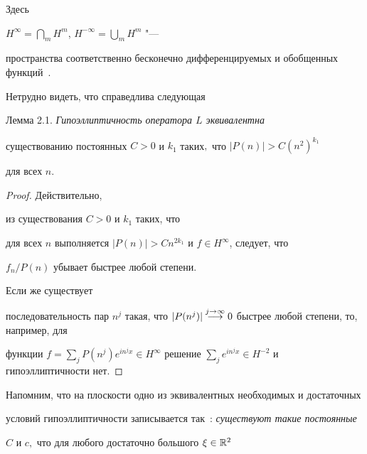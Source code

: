 Здесь

$H^\infty ={\bigcap_m} H^m$, $H^{- \infty} = {\bigcup_m} H^m$ "---

пространства соответственно бесконечно дифференцируемых и обобщенных функций~\cite{bur:1}.



Нетрудно видеть, что справедлива следующая



\smallskip



\hypertarget{bur:lemma:2.1}{}



{\small\sc Лемма  2.1.} \it Гипоэллиптичность оператора $L$ эквивалентна

существованию постоянных $C > 0$ и $k_1$ таких$,$ что $|P(n)| > C (n^2)^{k_1}$

для всех $n.$



\smallskip



\rm



\begin{proof} Действительно,

из существования $C > 0$ и $k_1$ таких, что

для всех $n$ выполняется $ |P(n)| > C n^{2 k_1}$ и $f \in H^\infty$, следует, что

${f_n}/{P(n)}$ убывает быстрее любой степени. 



Если же существует

последовательность пар $n^j$ такая, что $|P(n^j)| \overset {\scriptsize

j \to \infty}{\longrightarrow} 0$ быстрее любой степени, то, например, для

функции $f = \sum_j P(n^j) e^{i n^j x} \in H^\infty$ решение $\sum_j

e^{i n^j x} \in H^{-2}$ и гипоэллиптичности нет.

\hfill \end{proof}



\smallskip



Напомним, что на плоскости одно из эквивалентных необходимых и достаточных

условий гипоэллиптичности записывается так~\cite{bur:12}: \it существуют такие постоянные

$C$  и $c,$ что для любого достаточно большого $\xi \in {\Bbb R}^2$

